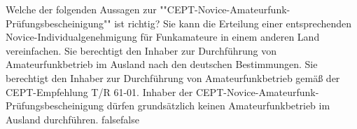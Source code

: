     {Welche der folgenden Aussagen zur ""CEPT-Novice-Amateurfunk-Prüfungsbescheinigung"" ist richtig?}
    {Sie kann die Erteilung einer entsprechenden Novice-Individualgenehmigung für Funkamateure in einem anderen Land vereinfachen.}
    {Sie berechtigt den Inhaber zur Durchführung von Amateurfunkbetrieb im Ausland nach den deutschen Bestimmungen.}
    {Sie berechtigt den Inhaber zur Durchführung von Amateurfunkbetrieb gemäß der CEPT-Empfehlung T/R 61-01.}
    {Inhaber der CEPT-Novice-Amateurfunk-Prüfungsbescheinigung dürfen grundsätzlich keinen Amateurfunkbetrieb im Ausland durchführen.}
    {false}{false}